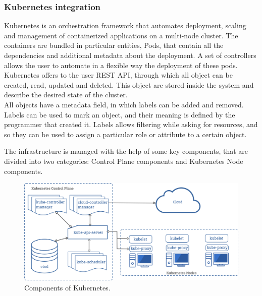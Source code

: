 \subsubsection*{Kubernetes integration}
Kubernetes is an orchestration framework that automates deployment, scaling and management of containerized
applications on a multi-node cluster.
The containers are bundled in particular entities, Pods, that contain all the dependencies and 
additional metadata about the deployment. A set of controllers allows the user to automate
in a flexible way the deployment of these pods.
\\
Kubernetes offers to the user REST API, through which all object can be created, read, updated
and deleted. This object are stored inside the system and describe the desired state of the cluster.
\\
All objects have a metadata field, in which labels can be added and removed.
Labels can be used to mark an object, and their meaning is defined by the programmer that created it.
Labels allows filtering while asking for resources, and so they can be used to assign a particular role 
or attribute to a certain object.
\par
The infrastructure is managed with the help of some key components, that are divided into two categories:
Control Plane components and Kubernetes Node components.
\begin{figure}
    \includegraphics[width=\linewidth]{images/components-of-kubernetes.png}
    \caption{Components of Kubernetes.}
    \label{fig:boat1}
  \end{figure}


